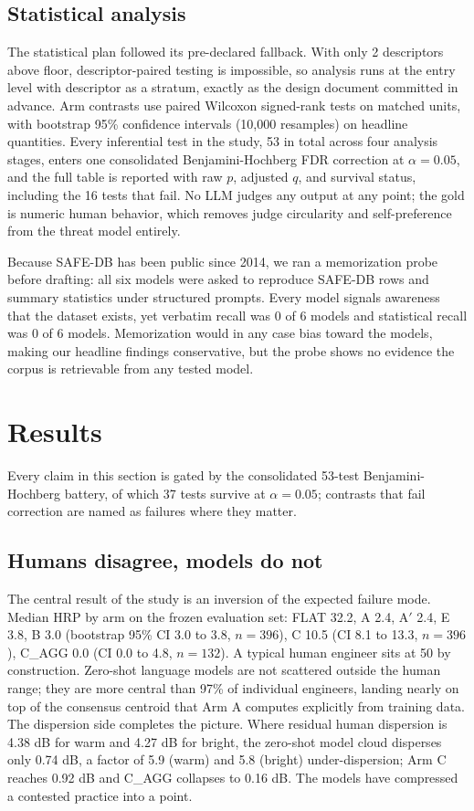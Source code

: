 \documentclass[11pt]{article}
\begin{document}
\subsection{Statistical analysis}

The statistical plan followed its pre-declared fallback. With only 2 descriptors above floor, descriptor-paired testing is impossible, so analysis runs at the entry level with descriptor as a stratum, exactly as the design document committed in advance. Arm contrasts use paired Wilcoxon signed-rank tests on matched units, with bootstrap 95\% confidence intervals (10,000 resamples) on headline quantities. Every inferential test in the study, 53 in total across four analysis stages, enters one consolidated Benjamini-Hochberg FDR correction at $\alpha = 0.05$, and the full table is reported with raw $p$, adjusted $q$, and survival status, including the 16 tests that fail. No LLM judges any output at any point; the gold is numeric human behavior, which removes judge circularity and self-preference from the threat model entirely.

Because SAFE-DB has been public since 2014, we ran a memorization probe before drafting: all six models were asked to reproduce SAFE-DB rows and summary statistics under structured prompts. Every model signals awareness that the dataset exists, yet verbatim recall was 0 of 6 models and statistical recall was 0 of 6 models. Memorization would in any case bias toward the models, making our headline findings conservative, but the probe shows no evidence the corpus is retrievable from any tested model.

\section{Results}

Every claim in this section is gated by the consolidated 53-test Benjamini-Hochberg battery, of which 37 tests survive at $\alpha = 0.05$; contrasts that fail correction are named as failures where they matter.

\subsection{Humans disagree, models do not}

The central result of the study is an inversion of the expected failure mode. Median HRP by arm on the frozen evaluation set: FLAT 32.2, A 2.4, A$'$ 2.4, E 3.8, B 3.0 (bootstrap 95\% CI 3.0 to 3.8, $n=396$), C 10.5 (CI 8.1 to 13.3, $n=396$), C\_AGG 0.0 (CI 0.0 to 4.8, $n=132$). A typical human engineer sits at 50 by construction. Zero-shot language models are not scattered outside the human range; they are more central than 97\% of individual engineers, landing nearly on top of the consensus centroid that Arm A computes explicitly from training data. The dispersion side completes the picture. Where residual human dispersion is 4.38 dB for warm and 4.27 dB for bright, the zero-shot model cloud disperses only 0.74 dB, a factor of 5.9 (warm) and 5.8 (bright) under-dispersion; Arm C reaches 0.92 dB and C\_AGG collapses to 0.16 dB. The models have compressed a contested practice into a point.
\end{document}
